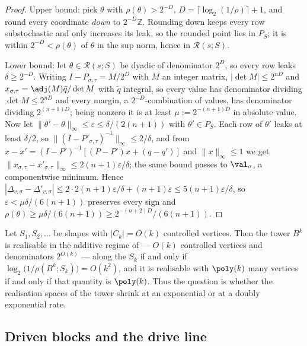 \begin{proof}
Upper bound: pick $\theta$ with $\rho(\theta)>2^{-D}$, $D=\lceil\log_2(1/\rho)\rceil+1$,
and round every coordinate \emph{down} to $2^{-D}\mathbb Z$. Rounding down
keeps every row substochastic and only increases its leak, so the rounded
point lies in $P_S$; it is within $2^{-D}<\rho(\theta)$ of $\theta$ in the sup
norm, hence in $\mathcal R(s;S)$.

Lower bound: let $\theta\in\mathcal R(s;S)$ be dyadic of denominator $2^{D}$,
so every row leaks $\delta\ge2^{-D}$. Writing $I-P_{\sigma,\tau}=M/2^{D}$ with
$M$ an integer matrix, $|\det M|\le2^{nD}$ and
$x_{\sigma,\tau}=\adj(M)\tilde q/\det M$ with $\tilde q$ integral, so every
value has denominator dividing $\det M\le2^{nD}$ and every margin, a
$2^{-D}$-combination of values, has denominator dividing $2^{(n+1)D}$; being
nonzero it is at least $\mu:=2^{-(n+1)D}$ in absolute value. Now let
$\|\theta'-\theta\|_\infty\le\varepsilon\le\delta/(2(n+1))$ with
$\theta'\in P_S$. Each row of $\theta'$ leaks at least $\delta/2$, so
$\|(I-P'_{\sigma,\tau})^{-1}\|_\infty\le2/\delta$, and from
$x-x'=(I-P')^{-1}[(P-P')x+(q-q')]$ and $\|x\|_\infty\le1$ we get
$\|x_{\sigma,\tau}-x'_{\sigma,\tau}\|_\infty\le2(n+1)\varepsilon/\delta$; the
same bound passes to $\val_\sigma$, a componentwise minimum. Hence
$|\Delta_{v,\sigma}-\Delta'_{v,\sigma}|\le
2\cdot2(n+1)\varepsilon/\delta+(n+1)\varepsilon\le5(n+1)\varepsilon/\delta$,
so $\varepsilon<\mu\delta/(6(n+1))$ preserves every sign and
$\rho(\theta)\ge\mu\delta/(6(n+1))\ge2^{-(n+2)D}/(6(n+1))$.
\end{proof}

\begin{corollary}\label{rs:metric}
Let $S_1,S_2,\dots$ be shapes with $|C_k|=O(k)$ controlled vertices. Then the
tower $B^{k}$ is realisable in the additive regime of
 --- $O(k)$ controlled vertices and denominators
$2^{O(k)}$ --- along the $S_k$ if and only if
$\log_2\bigl(1/\rho(B^{k};S_k)\bigr)=O(k^{2})$, and it is realisable with
$\poly(k)$ many vertices if and only if that quantity is $\poly(k)$. Thus the
question is whether the realisation spaces of the tower shrink at an
exponential or at a doubly exponential rate.
\end{corollary}

\subsection{Driven blocks and the drive line}\label{rs:sec-drive}

